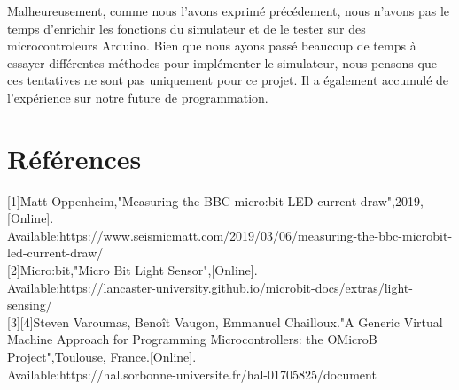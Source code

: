 \documentclass[14px]{article}
\begin{document}
Malheureusement, comme nous l'avons exprimé précédement, nous n'avons pas le temps d'enrichir les fonctions du simulateur et de le tester sur des microcontroleurs Arduino. Bien que nous ayons passé beaucoup de temps à essayer différentes méthodes pour implémenter le simulateur, nous pensons que ces tentatives ne sont pas uniquement pour ce projet. Il a également accumulé de l'expérience sur notre future de programmation.

\section{Références}
[1]Matt Oppenheim,"Measuring the BBC micro:bit LED current draw",2019,[Online].\\
Available:https://www.seismicmatt.com/2019/03/06/measuring-the-bbc-microbit-led-current-draw/\\

[2]Micro:bit,"Micro Bit Light Sensor",[Online].\\
Available:https://lancaster-university.github.io/microbit-docs/extras/light-sensing/\\

[3][4]Steven Varoumas, Benoît Vaugon, Emmanuel Chailloux."A Generic Virtual Machine Approach for Programming Microcontrollers: the OMicroB Project",Toulouse, France.[Online].\\
Available:https://hal.sorbonne-universite.fr/hal-01705825/document\\
\end{document}
